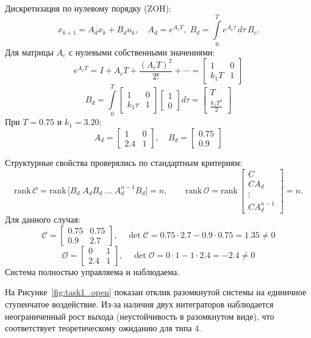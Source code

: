 Дискретизация по нулевому порядку (ZOH):
\[\label{eq:disc_model}
 x_{k+1} = A_d x_k + B_d u_k,\quad A_d = e^{A_c T},\; B_d = \int\limits_0^{T} e^{A_c \tau}\, d\tau\, B_c.
\]
Для матрицы $A_c$ с нулевыми собственными значениями:
\[
e^{A_c T} = I + A_c T + \frac{(A_c T)^2}{2!} + \cdots = \begin{bmatrix}1 & 0\\ k_1 T & 1\end{bmatrix}
\]
\[
B_d = \int\limits_0^{T} \begin{bmatrix}1 & 0\\ k_1 \tau & 1\end{bmatrix} \begin{bmatrix}1\\0\end{bmatrix} d\tau = \begin{bmatrix}T\\ \frac{k_1 T^2}{2}\end{bmatrix}
\]
При $T=0.75$ и $k_1=3.20$:
\[
A_d = \begin{bmatrix}1 & 0\\ 2.4 & 1\end{bmatrix},\quad B_d = \begin{bmatrix}0.75\\ 0.9\end{bmatrix}
\]

Структурные свойства проверялись по стандартным критериям: 
\[\text{rank}\, \mathcal C = \text{rank}\,\bigl[ B_d\; A_d B_d\; \dots \; A_d^{n-1} B_d \bigr] = n,\qquad 
\text{rank}\, \mathcal O = \text{rank}\,\begin{bmatrix} C\\ C A_d \\ \vdots \\ C A_d^{n-1}\end{bmatrix}= n.
\]
Для данного случая:
\[
\mathcal C = \begin{bmatrix}0.75 & 0.75\\ 0.9 & 2.7\end{bmatrix},\quad \det\mathcal C = 0.75 \cdot 2.7 - 0.9 \cdot 0.75 = 1.35 \neq 0
\]
\[
\mathcal O = \begin{bmatrix}0 & 1\\ 2.4 & 1\end{bmatrix},\quad \det\mathcal O = 0 \cdot 1 - 1 \cdot 2.4 = -2.4 \neq 0
\]
Система полностью управляема и наблюдаема.

На Рисунке~\ref{fig:task1_open} показан отклик разомкнутой системы на единичное ступенчатое воздействие. Из-за наличия двух интеграторов наблюдается неограниченный рост выхода (неустойчивость в разомкнутом виде), что соответствует теоретическому ожиданию для типа 4.

